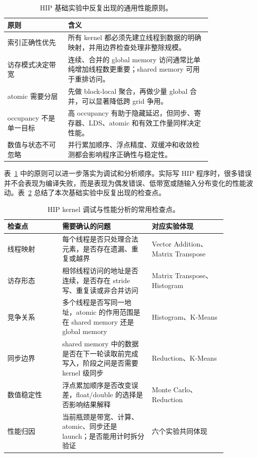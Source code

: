 \documentclass[10pt,a4paper]{article}
\begin{document}
\begin{table}[H]
\centering
\small
\caption{HIP 基础实验中反复出现的通用性能原则。}
\label{tab:hip-principles}
\begin{tabular}{p{0.24\linewidth}p{0.58\linewidth}}
\toprule
原则 & 含义 \\
\midrule
索引正确性优先 & 所有 kernel 都必须先建立线程到数据的明确映射，并用边界检查处理非整除规模。 \\
访存模式决定带宽 & 连续、合并的 global memory 访问通常比单纯增加线程数更重要；shared memory 可用于重排访问。 \\
atomic 需要分层 & 先做 block-local 聚合，再做少量 global 合并，可以显著降低跨 grid 争用。 \\
occupancy 不是单一目标 & 高 occupancy 有助于隐藏延迟，但同步、寄存器、LDS、atomic 和有效工作量同样决定性能。 \\
数值与状态不可忽略 & 并行累加顺序、浮点精度、双缓冲和收敛检测都会影响程序正确性与稳定性。 \\
\bottomrule
\end{tabular}
\end{table}

表~\ref{tab:hip-principles} 中的原则可以进一步落实为调试和分析顺序。实际写 HIP 程序时，很多错误并不会表现为编译失败，而是表现为偶发错误、低带宽或随输入分布变化的性能波动。表~\ref{tab:hip-checklist} 总结了本次基础实验中反复出现的检查点。

\begin{table}[H]
\centering
\small
\caption{HIP kernel 调试与性能分析的常用检查点。}
\label{tab:hip-checklist}
\begin{tabular}{p{0.22\linewidth}p{0.36\linewidth}p{0.30\linewidth}}
\toprule
检查点 & 需要确认的问题 & 对应实验体现 \\
\midrule
线程映射 & 每个线程是否只处理合法元素，是否存在遗漏、重复或越界 & Vector Addition、Matrix Transpose \\
访存形态 & 相邻线程访问的地址是否连续，是否存在 stride 写、重复读或非合并访问 & Matrix Transpose、Histogram \\
竞争关系 & 多个线程是否写同一地址，atomic 的作用范围是在 shared memory 还是 global memory & Histogram、K-Means \\
同步边界 & shared memory 中的数据是否在下一轮读取前完成写入，阶段之间是否需要 kernel 级同步 & Reduction、K-Means \\
数值稳定性 & 浮点累加顺序是否改变误差，float/double 的选择是否影响结果解释 & Monte Carlo、Reduction \\
性能归因 & 当前瓶颈是带宽、计算、atomic、同步还是 launch；是否能用计时拆分验证 & 六个实验共同体现 \\
\bottomrule
\end{tabular}
\end{table}
\end{document}
